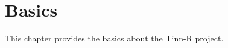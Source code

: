 

\hypertarget{basic}{}
\chapter{Basics}

This chapter provides the basics about the Tinn-R project.

\newpage

\newpage

\newpage

